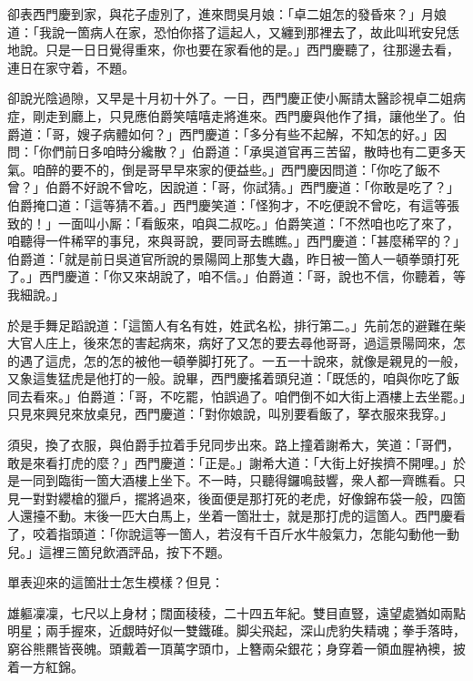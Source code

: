 卻表西門慶到家，與花子虛別了，進來問吳月娘：「卓二姐怎的發昏來？」月娘道：「我說一箇病人在家，恐怕你搭了這起人，又纏到那裡去了，故此叫玳安兒恁地說。只是一日日覺得重來，你也要在家看他的是。」西門慶聽了，往那邊去看，連日在家守着，不題。

卻說光陰過隙，又早是十月初十外了。一日，西門慶正使小厮請太醫診視卓二姐病症，剛走到廳上，只見應伯爵笑嘻嘻走將進來。西門慶與他作了揖，讓他坐了。伯爵道：「哥，嫂子病體如何？」西門慶道：「多分有些不起解，不知怎的好。」因問：「你們前日多咱時分纔散？」伯爵道：「承吳道官再三苦留，散時也有二更多天氣。咱醉的要不的，倒是哥早早來家的便益些。」西門慶因問道：「你吃了飯不曾？」伯爵不好說不曾吃，因說道：「哥，你試猜。」西門慶道：「你敢是吃了？」伯爵掩口道：「這等猜不着。」{}西門慶笑道：「怪狗才，不吃便說不曾吃，有這等張致的！」一面叫小厮：「看飯來，咱與二叔吃。」伯爵笑道：「不然咱也吃了來了，咱聽得一件稀罕的事兒，來與哥說，要同哥去瞧瞧。」西門慶道：「甚麼稀罕的？」伯爵道：「就是前日吳道官所說的景陽岡上那隻大蟲，昨日被一箇人一頓拳頭打死了。」西門慶道：「你又來胡說了，咱不信。」伯爵道：「哥，說也不信，你聽着，等我細說。」

於是手舞足蹈說道：「這箇人有名有姓，姓武名松，排行第二。」先前怎的避難在柴大官人庄上，後來怎的害起病來，病好了又怎的要去尋他哥哥，過這景陽岡來，怎的遇了這虎，怎的怎的被他一頓拳脚打死了。一五一十說來，就像是親見的一般，又象這隻猛虎是他打的一般。說畢，西門慶搖着頭兒道：「既恁的，咱與你吃了飯同去看來。」伯爵道：「哥，不吃罷，怕誤過了。咱們倒不如大街上酒樓上去坐罷。」只見來興兒來放桌兒，西門慶道：「對你娘說，叫別要看飯了，拏衣服來我穿。」

須臾，換了衣服，與伯爵手拉着手兒同步出來。路上撞着謝希大，笑道：「哥們，敢是來看打虎的麼？」西門慶道：「正是。」謝希大道：「大街上好挨擠不開哩。」於是一同到臨街一箇大酒樓上坐下。不一時，只聽得鑼鳴鼓響，衆人都一齊瞧看。只見一對對纓槍的獵戶，擺將過來，後面便是那打死的老虎，好像錦布袋一般，四箇人還擡不動。末後一匹大白馬上，坐着一箇壯士，就是那打虎的這箇人。西門慶看了，咬着指頭道：「你說這等一箇人，若沒有千百斤水牛般氣力，怎能勾動他一動兒。」{}這裡三箇兒飲酒評品，按下不題。

單表迎來的這箇壯士怎生模樣？但見：

\begin{myquote}
雄軀凜凜，七尺以上身材；闊面稜稜，二十四五年紀。雙目直豎，遠望處猶如兩點明星；兩手握來，近覷時好似一雙鐵碓。脚尖飛起，深山虎豹失精魂；拳手落時，窮谷熊羆皆䘮魄。頭戴着一頂萬字頭巾，上簪兩朵銀花；身穿着一領血腥衲襖，披着一方紅錦。
\end{myquote}

